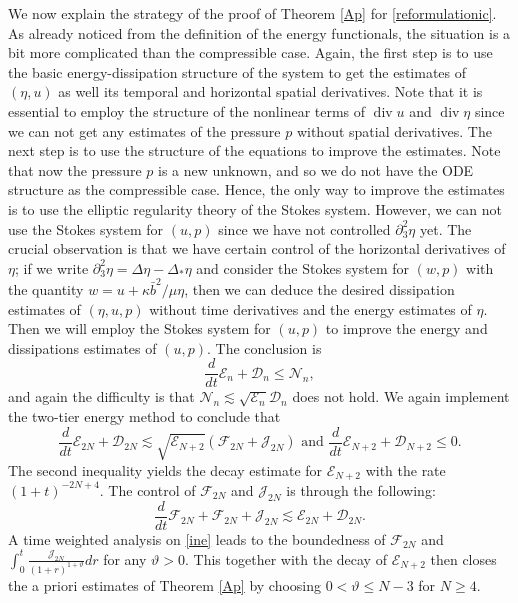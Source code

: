 \documentclass[a4paper,reqno,11pt]{amsart}
\numberwithin{equation}{section}
\providecommand{\sd}[1]{\mathcal{D}_{#1}}
\providecommand{\se}[1]{\mathcal{E}_{#1}}
\begin{document}
We now explain the strategy of the proof of Theorem \ref{Ap} for \eqref{reformulationic}. As already noticed from the definition of the energy functionals, the situation is a bit more complicated than the compressible case. Again, the first step is to use the basic energy-dissipation structure of the system to get the estimates of $(\eta,u)$ as well its temporal and horizontal spatial derivatives. Note that it is essential to employ the structure of the nonlinear terms of $\operatorname{div} u$ and $\operatorname{div} \eta$ since we can not get any estimates of the pressure $p$ without spatial derivatives. The next step is to use the structure of the equations to improve the estimates. Note that now the pressure $p$ is a new unknown, and so we do not have the ODE structure as the compressible case. Hence, the only way to improve the estimates is to use the elliptic regularity theory of the Stokes system. However, we can not use the Stokes system for $(u,p)$ since we have not controlled ${\partial}_3^2\eta$ yet. The crucial observation is that we have certain control of the horizontal derivatives of $\eta$; if we write ${\partial}_3^2\eta=\Delta\eta-\Delta_\ast\eta$ and consider the Stokes system for $(w,p)$ with the quantity $w=  u+  \kappa\bar b^2/\mu \eta$, then we can deduce the desired dissipation estimates of $(\eta,u,p)$ without time derivatives and the energy estimates of $\eta$. Then we will employ the Stokes system for $(u,p)$ to improve the energy and dissipations estimates of $(u,p)$. The conclusion is
\begin{equation}
{ \frac{d}{dt}} \se{n}+\sd{n}\le \mathcal{N}_n,
\end{equation}
and again the difficulty is that $\mathcal{N}_n{\lesssim} \sqrt{\se{n}}\sd{n}$ does not hold. We again implement the two-tier energy method to conclude that
\begin{equation}\label{conclu2}
 \frac{d}{dt} \se{2N} + \sd{2N} {\lesssim}  \sqrt{\se{N+2}}({\mathcal{F}_{2N}}+\mathcal{J}_{2N}) \text{ and } \frac{d}{dt} \se{N+2} + \sd{N+2} \le 0.
\end{equation}
The second inequality yields the decay estimate for $\se{N+2}$ with the rate $(1+t)^{-2N+4}$.
The control of ${\mathcal{F}_{2N}} $ and $\mathcal{J}_{2N} $ is through the following:
\begin{equation}\label{ine}
 { \frac{d}{dt}} {\mathcal{F}}_{2N}
+  {\mathcal{F}_{2N}} +\mathcal{J}_{2N}  {\lesssim}    \se{2N}+ \sd{2N}.
\end{equation}
A time weighted analysis on \eqref{ine} leads to the boundedness of ${\mathcal{F}_{2N}}$ and $
  \int_0^t \frac{\mathcal{J}_{2N}}{(1+r)^{1+\vartheta}}dr $ for any $\vartheta>0.$
This together with the decay of $\se{N+2}$ then closes the a priori estimates of Theorem \ref{Ap} by choosing $0<\vartheta\le N-3$ for $N\ge 4$.
\end{document}
